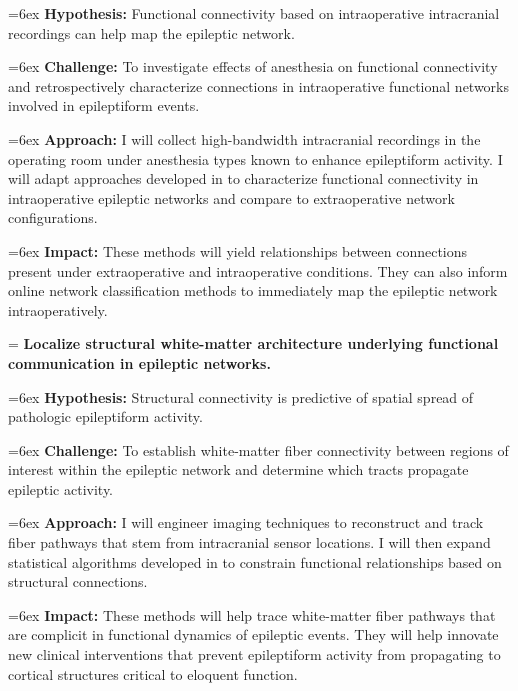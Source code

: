 \hangindent=6ex
\textbf{Hypothesis:} Functional connectivity based on intraoperative intracranial recordings can help map the epileptic network.

\hangindent=6ex
\textbf{Challenge:} To investigate effects of anesthesia on functional connectivity and retrospectively characterize connections in intraoperative functional networks involved in epileptiform events.

\hangindent=6ex
\textbf{Approach:} I will collect high-bandwidth intracranial recordings in the operating room under anesthesia types known to enhance epileptiform activity. I will adapt approaches developed in  to characterize functional connectivity in intraoperative epileptic networks and compare to extraoperative network configurations.

\hangindent=6ex
\textbf{Impact:} These methods will yield relationships between connections present under extraoperative and intraoperative conditions. They can also inform online network classification methods to immediately map the epileptic network intraoperatively.


\hangindent=\parindent
{}
\noindent
{} \textbf{Localize structural white-matter architecture underlying functional communication in epileptic networks.}

\hangindent=6ex
\textbf{Hypothesis:} Structural connectivity is predictive of spatial spread of pathologic epileptiform activity.

\hangindent=6ex
\textbf{Challenge:} To establish white-matter fiber connectivity between regions of interest within the epileptic network and determine which tracts propagate epileptic activity.

\hangindent=6ex
\textbf{Approach:} I will engineer imaging techniques to reconstruct and track fiber pathways that stem from intracranial sensor locations. I will then expand statistical algorithms developed in  to constrain functional relationships based on structural connections.

\hangindent=6ex
\textbf{Impact:} These methods will help trace white-matter fiber pathways that are complicit in functional dynamics of epileptic events. They will help innovate new clinical interventions that prevent epileptiform activity from propagating to cortical structures critical to eloquent function.
